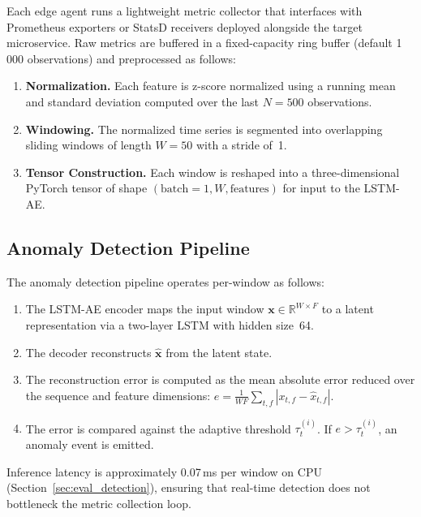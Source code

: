 Each edge agent runs a lightweight metric collector that interfaces with
Prometheus exporters or StatsD receivers deployed alongside the target
microservice. Raw metrics are buffered in a fixed-capacity ring buffer (default
1\,000 observations) and preprocessed as follows:

\begin{enumerate}
    \item \textbf{Normalization.} Each feature is z-score normalized using a
    running mean and standard deviation computed over the last $N=500$
    observations.

    \item \textbf{Windowing.} The normalized time series is segmented into
    overlapping sliding windows of length $W=50$ with a stride of~1.

    \item \textbf{Tensor Construction.} Each window is reshaped into a
    three-dimensional PyTorch tensor of shape
    $(\text{batch}=1, W, \text{features})$ for input to the LSTM-AE.
\end{enumerate}

\subsection{Anomaly Detection Pipeline}
\label{subsec:design_detection_pipeline}

The anomaly detection pipeline operates per-window as follows:

\begin{enumerate}
    \item The LSTM-AE encoder maps the input window $\mathbf{x} \in
    \mathbb{R}^{W \times F}$ to a latent representation via a two-layer LSTM
    with hidden size~64.

    \item The decoder reconstructs $\hat{\mathbf{x}}$ from the latent state.

    \item The reconstruction error is computed as the mean absolute error
    reduced over the sequence and feature dimensions:
    $e = \frac{1}{WF}\sum_{t,f}|x_{t,f} - \hat{x}_{t,f}|$.

    \item The error is compared against the adaptive threshold
    $\tau_t^{(i)}$. If $e > \tau_t^{(i)}$, an anomaly event is emitted.
\end{enumerate}

Inference latency is approximately 0.07\,ms per window on CPU
(Section~\ref{sec:eval_detection}), ensuring that real-time detection does not
bottleneck the metric collection loop.

